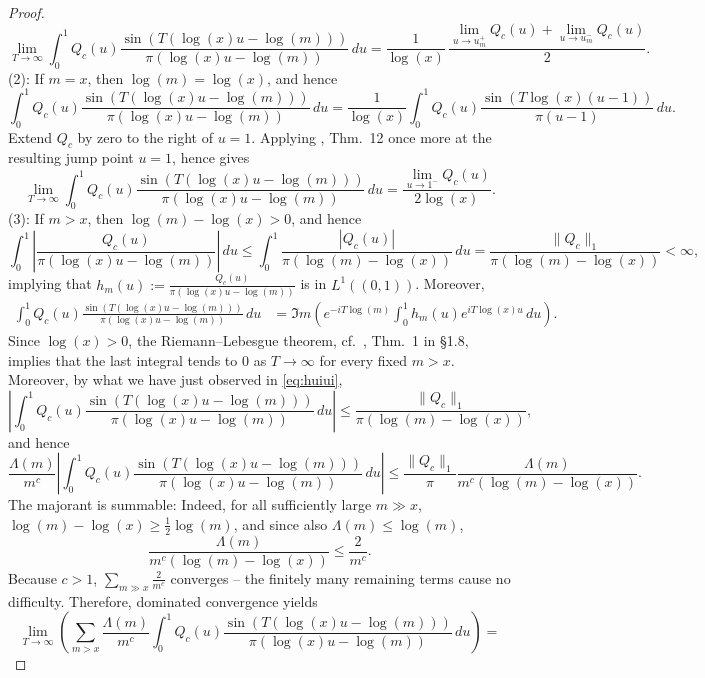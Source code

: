 \documentclass[a4paper,10pt]{amsart}
\theoremstyle{definition}
\numberwithin{equation}{section}
\begin{document}
\begin{proof}
\begin{equation}\label{eq:right-dirichlet}
\lim_{T\to\infty}\int_0^1Q_c(u)\frac{\sin(T(\log(x)u-\log(m)))}{\pi(\log(x)u-\log(m))}\,du=\frac1{\log(x)}\,\frac{\lim_{u\to u_m^+}Q_c(u)+\lim_{u\to u_m^-}Q_c(u)}2.
\end{equation}
(2): If $m=x$, then $\log(m)=\log(x)$, and hence
$$
\int_0^1Q_c(u)\frac{\sin(T(\log(x)u-\log(m)))}{\pi(\log(x)u-\log(m))}\,du=\frac{1}{\log(x)}\int_0^1Q_c(u)\frac{\sin(T\log(x)(u-1))}{\pi(u-1)}\,du.
$$
Extend $Q_c$ by zero to the right of $u=1$.  Applying \cite{TitchmarshFourier}, Thm.\ 12 once more at the resulting jump point $u=1$, hence gives
\begin{equation}\label{eq:right-dirichlet2}
\lim_{T\to\infty}\int_0^1Q_c(u)\frac{\sin(T(\log(x)u-\log(m)))}{\pi(\log(x)u-\log(m))}\,du=\frac{\lim_{u\to 1^-}Q_c(u)}{2\log(x)}.
\end{equation}
(3): If $m>x$, then $\log(m)-\log(x)>0$, and hence
\begin{equation}\label{eq:huiui}
\int_0^1\left| \frac{Q_c(u)}{\pi(\log(x)u-\log(m))}\right|\,du \leq \int_0^1\frac{|Q_c(u)|}{\pi(\log(m)-\log(x))}\,du=\frac{\|Q_c\|_1}{\pi(\log(m)-\log(x))}<\infty,
\end{equation}
implying that $h_m(u):=\frac{Q_c(u)}{\pi(\log(x)u-\log(m))}$ is in $L^1((0,1))$. Moreover,
$$
\begin{aligned}
\int_0^1Q_c(u)\frac{\sin(T(\log(x)u-\log(m)))}{\pi(\log(x)u-\log(m))}\,du&=\Im m\left(e^{-iT\log(m)}\int_0^1 h_m(u)e^{iT\log(x)u}\,du\right).
\end{aligned}
$$
Since $\log(x)>0$, the Riemann--Lebesgue theorem, cf.\  \cite{TitchmarshFourier}, Thm.\ 1 in \S1.8, implies that the last integral tends to $0$ as $T\to\infty$ for every fixed $m>x$. Moreover, by what we have just observed in \eqref{eq:huiui}, 
$$\left|\int_0^1Q_c(u) \frac{\sin(T(\log(x)u-\log(m)))}{\pi(\log(x)u-\log(m))}\,du\right|\le \frac{\|Q_c\|_1}{\pi(\log(m)-\log(x))},
$$
and hence
$$
\frac{\Lambda(m)}{m^c}\left|\int_0^1Q_c(u) \frac{\sin(T(\log(x)u-\log(m)))}{\pi(\log(x)u-\log(m))}\,du\right|\le\frac{\|Q_c\|_1}{\pi}\frac{\Lambda(m)}{m^c(\log(m)-\log(x))}.
$$
The majorant is summable: Indeed, for all sufficiently large $m\gg x$, $\log(m)-\log(x)\ge\frac12\log(m)$, and since also $\Lambda(m)\le\log(m)$,
$$
\frac{\Lambda(m)}{m^c(\log(m)-\log(x))}\le \frac{2}{m^c}.
$$
Because $c>1$, $\sum_{m\gg x}\frac{2}{m^c}$ converges -- the finitely many remaining
terms cause no difficulty. Therefore, dominated convergence yields
$$
\lim_{T\to\infty}\left(\sum_{m>x}\frac{\Lambda(m)}{m^c} \int_0^1Q_c(u) \frac{\sin(T(\log(x)u-\log(m)))}{\pi(\log(x)u-\log(m))}\,du\right)=
$$
\end{proof}
\end{document}
